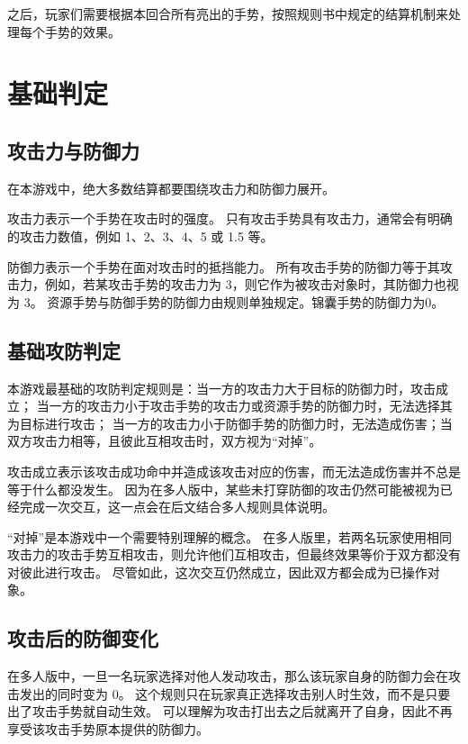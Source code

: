 \documentclass[12pt]{ctexart}
\begin{document}
之后，玩家们需要根据本回合所有亮出的手势，按照规则书中规定的结算机制来处理每个手势的效果。

\section{基础判定}

\subsection{攻击力与防御力}

在本游戏中，绝大多数结算都要围绕攻击力和防御力展开。

攻击力表示一个手势在攻击时的强度。
只有攻击手势具有攻击力，通常会有明确的攻击力数值，例如 1、2、3、4、5 或 1.5 等。

防御力表示一个手势在面对攻击时的抵挡能力。
所有攻击手势的防御力等于其攻击力，例如，若某攻击手势的攻击力为 3，则它作为被攻击对象时，其防御力也视为 3。
资源手势与防御手势的防御力由规则单独规定。锦囊手势的防御力为0。

\subsection{基础攻防判定}

本游戏最基础的攻防判定规则是：当一方的攻击力大于目标的防御力时，攻击成立；
当一方的攻击力小于攻击手势的攻击力或资源手势的防御力时，无法选择其为目标进行攻击；
当一方的攻击力小于防御手势的防御力时，无法造成伤害；当双方攻击力相等，且彼此互相攻击时，双方视为“对掉”。

攻击成立表示该攻击成功命中并造成该攻击对应的伤害，而无法造成伤害并不总是等于什么都没发生。
因为在多人版中，某些未打穿防御的攻击仍然可能被视为已经完成一次交互，这一点会在后文结合多人规则具体说明。

“对掉”是本游戏中一个需要特别理解的概念。
在多人版里，若两名玩家使用相同攻击力的攻击手势互相攻击，则允许他们互相攻击，但最终效果等价于双方都没有对彼此进行攻击。
尽管如此，这次交互仍然成立，因此双方都会成为已操作对象。

\subsection{攻击后的防御变化}

在多人版中，一旦一名玩家选择对他人发动攻击，那么该玩家自身的防御力会在攻击发出的同时变为 0。
这个规则只在玩家真正选择攻击别人时生效，而不是只要出了攻击手势就自动生效。
可以理解为攻击打出去之后就离开了自身，因此不再享受该攻击手势原本提供的防御力。
\end{document}
